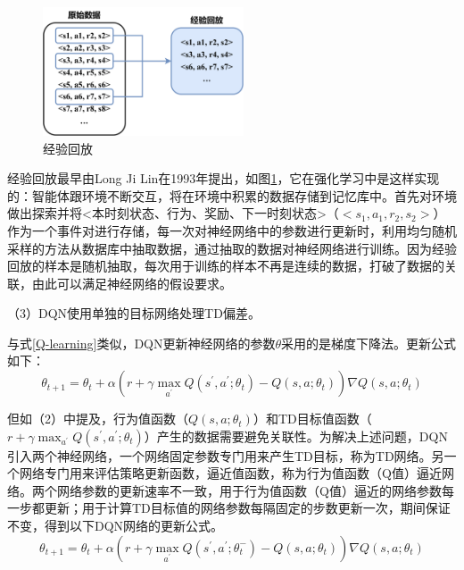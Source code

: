 \begin{figure}[htbp]
    \vspace{13pt} %
    \centering
    \includegraphics[width=0.53\textwidth]{images/chapter2/Experience_Replay.png}
    \caption{经验回放}\label{经验回放} %
\end{figure}

经验回放最早由Long Ji Lin在1993年提出\cite{1992Reinforcement}，如图\ref{经验回放}，它在强化学习中是这样实现的：智能体跟环境不断交互，将在环境中积累的数据存储到记忆库中。首先对环境做出探索并将<本时刻状态、行为、奖励、下一时刻状态>（$<s_1, a_1, r_2, s_2>$）作为一个事件对进行存储，每一次对神经网络中的参数进行更新时，利用均匀随机采样的方法从数据库中抽取数据，通过抽取的数据对神经网络进行训练。因为经验回放的样本是随机抽取，每次用于训练的样本不再是连续的数据，打破了数据的关联，由此可以满足神经网络的假设要求。

（3）DQN使用单独的目标网络处理TD偏差。

与式\ref{Q-learning}类似，DQN更新神经网络的参数$\theta$采用的是梯度下降法。更新公式如下：
\begin{equation*}
    \theta_{t+1} = \theta_t + \alpha (r + \gamma \max_{a^{'}} Q(s^{'}, a^{'}; \theta_t) - Q(s, a; \theta_t))\nabla   Q(s, a; \theta_t)
\end{equation*}

但如（2）中提及，行为值函数（$Q(s, a; \theta_t)$）和TD目标值函数（$r + \gamma \max_{a^{'}} Q(s^{'}, a^{'}; \theta_t)$）产生的数据需要避免关联性。为解决上述问题，DQN引入两个神经网络，一个网络固定参数专门用来产生TD目标，称为TD网络。另一个网络专门用来评估策略更新函数，逼近值函数，称为行为值函数（Q值）逼近网络。两个网络参数的更新速率不一致，用于行为值函数（Q值）逼近的网络参数每一步都更新；用于计算TD目标值的网络参数每隔固定的步数更新一次，期间保证不变，得到以下DQN网络的更新公式。
\begin{equation}\label{DQN}
    \theta_{t+1} = \theta_t + \alpha (r + \gamma \max_{a^{'}} Q(s^{'}, a^{'}; \theta_t^{-}) - Q(s, a; \theta_t))\nabla   Q(s, a; \theta_t)
\end{equation}

